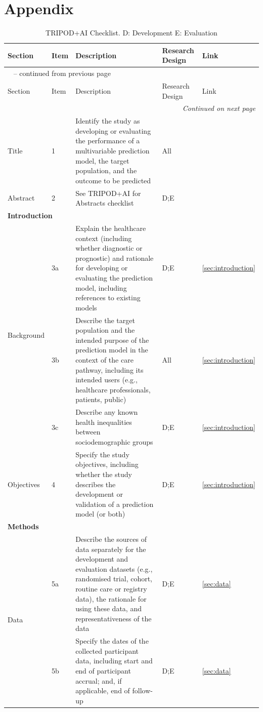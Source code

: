 \documentclass{article}
\begin{document}
\section{Appendix}


\begin{longtable}{p{} l p{} l l }
    \caption{TRIPOD+AI Checklist. D: Development E: Evaluation}
    \label{tab:TRIPOD-AI-Abstract}\\
    \toprule
    Section & Item & Description & Research Design & Link \\
    \midrule
    \endfirsthead

    \multicolumn{5}{l}{\tablename~\thetable{} -- continued from previous page}\\
    \toprule
    Section & Item & Description & Research Design & Link \\
    \midrule
    \endhead

    \midrule
    \multicolumn{5}{r}{\emph{Continued on next page}}\\
    \endfoot

    \bottomrule
    \endlastfoot


     \midrule
     Title & 1 & Identify the study as developing or evaluating the performance of a multivariable prediction model, the target population, and the outcome to be predicted & All &  \\
     Abstract &  2 & See TRIPOD+AI for Abstracts checklist & D;E &   \\
     \midrule
    \multicolumn{3}{l}{\textbf{Introduction}} \\
    \multirow{3}{4em}{Background} & 3a & Explain the healthcare context (including whether diagnostic or prognostic) and rationale for developing or evaluating the prediction model, including references to existing models & D;E & \ref{sec:introduction} \\
    & 3b & Describe the target population and the intended purpose of the prediction model in the context of the care pathway, including its intended users (e.g., healthcare professionals, patients, public) & All & \ref{sec:introduction} \\
    & 3c & Describe any known health inequalities between sociodemographic groups & D;E & \ref{sec:introduction} \\
    Objectives & 4 & Specify the study objectives, including whether the study describes the development or validation of a prediction model (or both) & D;E &  \ref{sec:introduction}\\
    \midrule
    \multicolumn{3}{l}{\textbf{Methods}} \\
    \multirow{2}{4em}{Data} & 5a & Describe the sources of data separately for the development and evaluation datasets (e.g., randomised trial, cohort, routine care or registry data), the rationale for using these data, and representativeness of the data & D;E &  \ref{sec:data} \\
    & 5b & Specify the dates of the collected participant data, including start and end of participant accrual; and, if applicable, end of follow-up & D;E &  \ref{sec:data} \\
    

\end{longtable}
\end{document}
